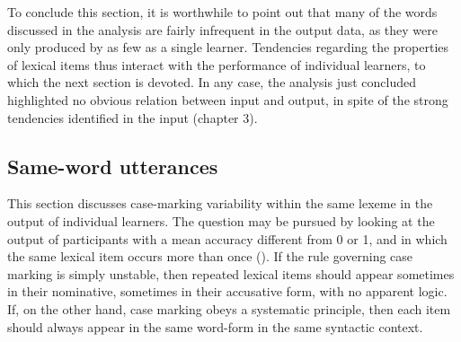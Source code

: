 To conclude this section, it is worthwhile to point out that many of the words discussed in the analysis are fairly infrequent in the output data, as they were only produced by as few as a single learner. Tendencies regarding the properties of lexical items thus interact with the performance of individual learners, to which the next section is devoted. In any case, the analysis just concluded highlighted no obvious relation between input and output, in spite of the strong tendencies identified in the input (chapter 3).

\subsection{Same-word utterances}\label{sec:07:2.2}

This section discusses case-marking variability within the same lexeme in the output of individual learners. The question may be pursued by looking at the output of participants with a mean accuracy different from 0 or 1, and in which the same lexical item occurs more than once (). If the rule governing case marking is simply unstable, then repeated lexical items should appear sometimes in their nominative, sometimes in their accusative form, with no apparent logic. If, on the other hand, case marking obeys a systematic principle, then each item should always appear in the same word-form in the same syntactic context.

